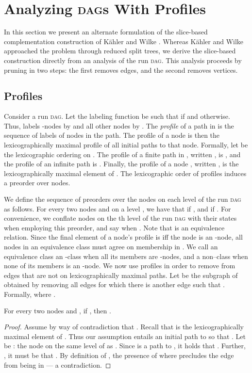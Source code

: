 \documentclass{LMCS}
\newcommand\kahler{K\"ahler\xspace}
\newcommand{\DAG}{\textsc{dag}\xspace}
\newcommand{\DAGs}{\textsc{dag}s\xspace}
\begin{document}
\section{Analyzing \DAGs With Profiles}\label{Sect:Comp_Profiles}

In this section we present an alternate formulation of the slice-based complementation construction
of \kahler and Wilke \cite{KW08}. Whereas \kahler and Wilke approached the problem through
reduced split trees, we derive the slice-based construction directly from an analysis of
the run \DAG. This analysis proceeds by pruning  in two steps: the first removes edges, and the
second removes vertices.

\subsection{Profiles}
Consider a run \DAG . Let the labeling function  be
such that  if  and  otherwise. Thus,
 labels -nodes by  and all other nodes by . The \emph{profile} of a path in 
is the sequence of labels of nodes in the path. The profile of a node is then the lexicographically
maximal profile of all initial paths to that node.  Formally, let  be the lexicographic
ordering on .  The profile of a finite path
 in , written , is , and
the profile of an infinite path  is . Finally,
the profile of a node , written , is the lexicographically maximal element of . The lexicographic order of profiles induces a preorder over
nodes.

We define the sequence of preorders  over the nodes on each level of the run \DAG as
follows.  For every two nodes  and  on a level , we have that  if
, and  if . For convenience, we conflate nodes on the th level of
the run \DAG with their states when employing this preorder, and say  when . Note that  is an equivalence relation. Since the final element of a
node's profile is  iff the node is an -node, all nodes in an equivalence class must agree
on membership in . We call an equivalence class an -class when all its members are -nodes,
and a non--class when none of its members is an -node.  We now use profiles in order to remove
from  edges that are not on lexicographically maximal paths.  Let  be the subgraph of
 obtained by removing all edges  for which there is another edge  such
that .  Formally,  where .

\begin{lem}\label{Gprime_Captures_Profiles}
For every two nodes  and , if , then .
\end{lem}
\begin{proof}
Assume by way of contradiction that .  Recall that  is the
lexicographically maximal element of . Thus our
assumption entails an initial path  to  so that . Let  be
: the node on the same level of  as . Since  is a path to , it holds that
. Further, , it must be that .  By definition of
, the presence of  where  precludes the edge  from being in 
--- a contradiction.
\end{proof}
\end{document}
